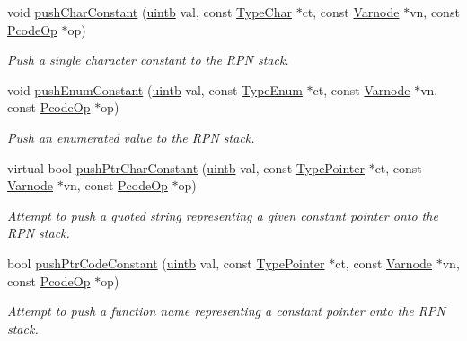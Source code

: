 \begin{DoxyCompactItemize}
void \mbox{\hyperlink{class_print_c_aefb75360529072c8623858fd8c909ca3}{push\+Char\+Constant}} (\mbox{\hyperlink{types_8h_a2db313c5d32a12b01d26ac9b3bca178f}{uintb}} val, const \mbox{\hyperlink{class_type_char}{Type\+Char}} $\ast$ct, const \mbox{\hyperlink{class_varnode}{Varnode}} $\ast$vn, const \mbox{\hyperlink{class_pcode_op}{Pcode\+Op}} $\ast$op)
\begin{DoxyCompactList}\small\item\em Push a single character constant to the R\+PN stack. \end{DoxyCompactList}\item 
void \mbox{\hyperlink{class_print_c_a70078a4551cf53bafcb44360afd2f027}{push\+Enum\+Constant}} (\mbox{\hyperlink{types_8h_a2db313c5d32a12b01d26ac9b3bca178f}{uintb}} val, const \mbox{\hyperlink{class_type_enum}{Type\+Enum}} $\ast$ct, const \mbox{\hyperlink{class_varnode}{Varnode}} $\ast$vn, const \mbox{\hyperlink{class_pcode_op}{Pcode\+Op}} $\ast$op)
\begin{DoxyCompactList}\small\item\em Push an enumerated value to the R\+PN stack. \end{DoxyCompactList}\item 
virtual bool \mbox{\hyperlink{class_print_c_ac3096b61ae4a7d0e78200fa946c54a95}{push\+Ptr\+Char\+Constant}} (\mbox{\hyperlink{types_8h_a2db313c5d32a12b01d26ac9b3bca178f}{uintb}} val, const \mbox{\hyperlink{class_type_pointer}{Type\+Pointer}} $\ast$ct, const \mbox{\hyperlink{class_varnode}{Varnode}} $\ast$vn, const \mbox{\hyperlink{class_pcode_op}{Pcode\+Op}} $\ast$op)
\begin{DoxyCompactList}\small\item\em Attempt to push a quoted string representing a given constant pointer onto the R\+PN stack. \end{DoxyCompactList}\item 
bool \mbox{\hyperlink{class_print_c_a60411f32d6cb0b986eb1f1f39296a529}{push\+Ptr\+Code\+Constant}} (\mbox{\hyperlink{types_8h_a2db313c5d32a12b01d26ac9b3bca178f}{uintb}} val, const \mbox{\hyperlink{class_type_pointer}{Type\+Pointer}} $\ast$ct, const \mbox{\hyperlink{class_varnode}{Varnode}} $\ast$vn, const \mbox{\hyperlink{class_pcode_op}{Pcode\+Op}} $\ast$op)
\begin{DoxyCompactList}\small\item\em Attempt to push a function name representing a constant pointer onto the R\+PN stack. \end{DoxyCompactList}\item 

\end{DoxyCompactItemize}
